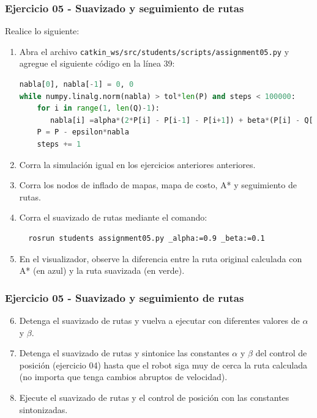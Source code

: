 \begin{frame}[containsverbatim]\frametitle{Ejercicio 05 - Suavizado y seguimiento de rutas}
  Realice lo siguiente:
  \begin{enumerate}
     \item Abra el archivo \texttt{catkin\_ws/src/students/scripts/assignment05.py} y agregue el siguiente código en la línea 39:
  \begin{lstlisting}[language=Python,firstnumber=39]
nabla[0], nabla[-1] = 0, 0
while numpy.linalg.norm(nabla) > tol*len(P) and steps < 100000:
    for i in range(1, len(Q)-1):
       nabla[i] =alpha*(2*P[i] - P[i-1] - P[i+1]) + beta*(P[i] - Q[i])
    P = P - epsilon*nabla
    steps += 1
  \end{lstlisting}
  \item Corra la simulación igual en los ejercicios anteriores anteriores. 
  \item Corra los nodos de inflado de mapas, mapa de costo, A* y seguimiento de rutas.
  \item Corra el suavizado de rutas mediante el comando:
    \begin{verbatim}
  rosrun students assignment05.py _alpha:=0.9 _beta:=0.1
\end{verbatim}
  \item En el visualizador, observe la diferencia entre la ruta original calculada con A* (en azul) y la ruta suavizada (en verde). 
  \end{enumerate}
\end{frame}


\begin{frame}[containsverbatim]\frametitle{Ejercicio 05 - Suavizado y seguimiento de rutas}
  \begin{enumerate}
    \setcounter{enumi}{5}
  \item Detenga el suavizado de rutas y vuelva a ejecutar con diferentes valores de $\alpha$ y $\beta$.
  \item Detenga el suavizado de rutas y sintonice las constantes $\alpha$ y $\beta$ del control de posición (ejercicio 04) hasta que el robot siga muy de cerca la ruta calculada (no importa que tenga cambios abruptos de velocidad).
  \item Ejecute el suavizado de rutas y el control de posición con las constantes sintonizadas.
  \end{enumerate}
\end{frame}

